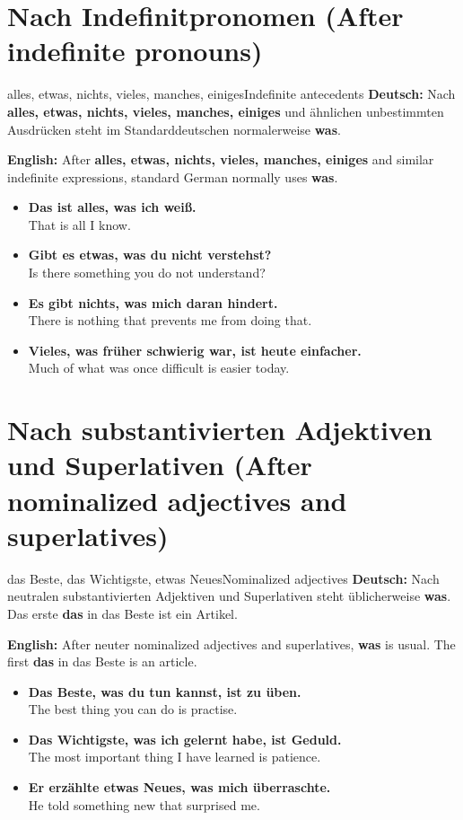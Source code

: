 \documentclass[a4paper,11pt]{article}
\newcommand{\GermanText}[1]{\textbf{Deutsch: }#1\par}
\newcommand{\EnglishText}[1]{{\small\color{SoftGray}\textbf{English: }#1\par}}
\newcommand{\ExampleItem}[2]{\item \textbf{#1}\\{\small\color{SoftGray}#2}}
\begin{document}
   \section{Nach Indefinitpronomen (After indefinite pronouns)}
         \begin{grammarentry}{alles, etwas, nichts, vieles, manches, einiges}{Indefinite antecedents}
            \GermanText{Nach \textbf{alles, etwas, nichts, vieles, manches, einiges} und ähnlichen unbestimmten Ausdrücken steht im Standarddeutschen normalerweise \textbf{was}.}
            \EnglishText{After \textbf{alles, etwas, nichts, vieles, manches, einiges} and similar indefinite expressions, standard German normally uses \textbf{was}.}
         \end{grammarentry}
         \begin{exbox}\begin{itemize}
            \ExampleItem{Das ist alles, was ich weiß.}{That is all I know.}
            \ExampleItem{Gibt es etwas, was du nicht verstehst?}{Is there something you do not understand?}
            \ExampleItem{Es gibt nichts, was mich daran hindert.}{There is nothing that prevents me from doing that.}
            \ExampleItem{Vieles, was früher schwierig war, ist heute einfacher.}{Much of what was once difficult is easier today.}
            \end{itemize}\end{exbox}
   \section{Nach substantivierten Adjektiven und Superlativen (After nominalized adjectives and superlatives)}
            \begin{grammarentry}{das Beste, das Wichtigste, etwas Neues}{Nominalized adjectives}
               \GermanText{Nach neutralen substantivierten Adjektiven und Superlativen steht üblicherweise \textbf{was}. Das erste \textbf{das} in \glqq das Beste\grqq{} ist ein Artikel.}
               \EnglishText{After neuter nominalized adjectives and superlatives, \textbf{was} is usual. The first \textbf{das} in \glqq das Beste\grqq{} is an article.}
            \end{grammarentry}
            \begin{exbox}\begin{itemize}
               \ExampleItem{Das Beste, was du tun kannst, ist zu üben.}{The best thing you can do is practise.}
               \ExampleItem{Das Wichtigste, was ich gelernt habe, ist Geduld.}{The most important thing I have learned is patience.}
               \ExampleItem{Er erzählte etwas Neues, was mich überraschte.}{He told something new that surprised me.}
               \end{itemize}\end{exbox}
\end{document}
